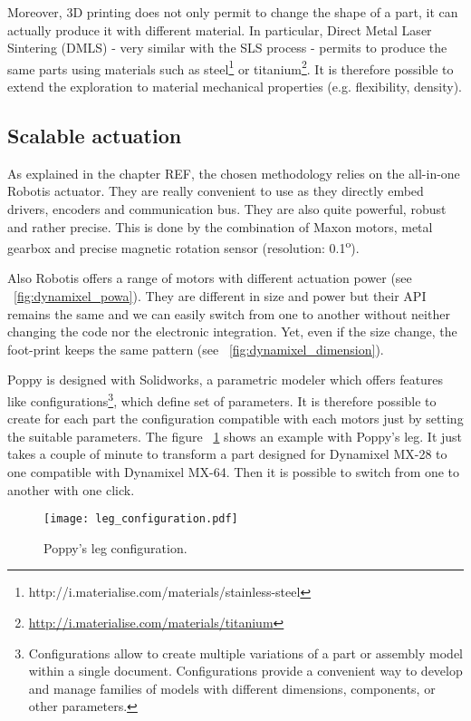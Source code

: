 Moreover, 3D printing does not only permit to change the shape of a part, it can actually produce it with different material. In particular, Direct Metal Laser Sintering (DMLS) - very similar with the SLS process - permits to produce the same parts using materials such as steel\footnote{http://i.materialise.com/materials/stainless-steel} or titanium\footnote{\url{http://i.materialise.com/materials/titanium}}. It is therefore possible to extend the exploration to material mechanical properties (e.g. flexibility, density).


\subsection{Scalable actuation} %

As explained in the chapter REF, the chosen methodology relies on the all-in-one Robotis actuator. They are really convenient to use as they directly embed drivers, encoders and communication bus. They are also quite powerful, robust and rather precise. This is done by the combination of Maxon motors, metal gearbox and precise magnetic rotation sensor (resolution: 0.1\textsuperscript{o}).

Also Robotis offers a range of motors with different actuation power (see \figurename~\ref{fig:dynamixel_powa}). They are different in size and power but their API remains the same and we can easily switch from one to another without neither changing the code nor the electronic integration. Yet, even if the size change, the foot-print keeps the same pattern (see \figurename~\ref{fig:dynamixel_dimension}).

Poppy is designed with Solidworks, a parametric modeler which offers features like configurations\footnote{Configurations allow to create multiple variations of a part or assembly model within a single document. Configurations provide a convenient way to develop and manage families of models with different dimensions, components, or other parameters.}, which define set of parameters. It is therefore possible to create for each part the configuration compatible with each motors just by setting the suitable parameters. The figure \figurename~\ref{fig:leg_configuration} shows an example with Poppy's leg. It just takes a couple of minute to transform a part designed for Dynamixel MX-28 to one compatible with Dynamixel MX-64. Then it is possible to switch from one to another with one click.

\begin{figure}[h]
    \begin{center}
        \texttt{[image: leg\_configuration.pdf]}
    \end{center}
    \caption{Poppy's leg configuration.}
    \label{fig:leg_configuration}
\end{figure}

